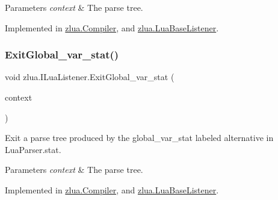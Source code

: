 \begin{DoxyParams}{Parameters}
{\em context} & The parse tree.\\
\hline
\end{DoxyParams}


Implemented in \mbox{\hyperlink{classzlua_1_1_compiler_a2d4b742668c3002d6396dca636a97dce}{zlua.\+Compiler}}, and \mbox{\hyperlink{classzlua_1_1_lua_base_listener_afc42dc32e923011884d110d92eb7024b}{zlua.\+Lua\+Base\+Listener}}.

\mbox{\label{interfacezlua_1_1_i_lua_listener_a4e14ac8afc7b39056fc78c89ac3ba8fa}} 
\subsubsection{\texorpdfstring{Exit\+Global\+\_\+var\+\_\+stat()}{ExitGlobal\_var\_stat()}}
{\footnotesize\ttfamily void zlua.\+I\+Lua\+Listener.\+Exit\+Global\+\_\+var\+\_\+stat (\begin{DoxyParamCaption}\item[{\mbox{[}\+Not\+Null\mbox{]} \mbox{\hyperlink{classzlua_1_1_lua_parser_1_1_global__var__stat_context}{Lua\+Parser.\+Global\+\_\+var\+\_\+stat\+Context}}}]{context }\end{DoxyParamCaption})}



Exit a parse tree produced by the {\ttfamily global\+\_\+var\+\_\+stat} labeled alternative in Lua\+Parser.\+stat. 


\begin{DoxyParams}{Parameters}
{\em context} & The parse tree.\\
\hline
\end{DoxyParams}


Implemented in \mbox{\hyperlink{classzlua_1_1_compiler_a6c1f448ee93660853921f2c0048bc173}{zlua.\+Compiler}}, and \mbox{\hyperlink{classzlua_1_1_lua_base_listener_a918c1a931ec0803f8ce782d404d9e2c4}{zlua.\+Lua\+Base\+Listener}}.

\mbox{\label{interfacezlua_1_1_i_lua_listener_a2f0389129d1846cafed21b068ecdb15d}} 
